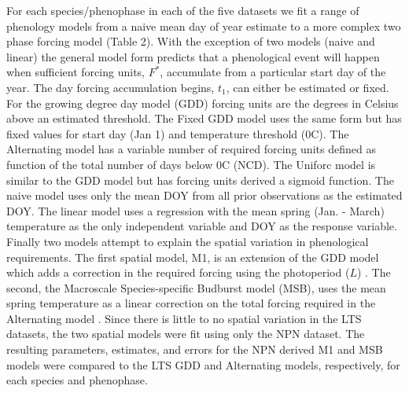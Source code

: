\documentclass[fleqn,10pt,lineno]{wlpeerj} %
\begin{document}
For each species/phenophase in each of the five datasets we fit a range of phenology models from a naive mean day of year estimate to a more complex two phase forcing model (Table 2). With the exception of two models (naive and linear) the general model form predicts that a phenological event will happen when sufficient forcing units, \(F^{*}\), accumulate from a particular start day of the year. The day forcing accumulation begins, $t_{1}$, can either be estimated or fixed. For the growing degree day model (GDD) forcing units are the degrees in Celsius above an estimated threshold. The Fixed GDD model uses the same form but has fixed values for start day (Jan 1) and temperature threshold (0C). The Alternating model has a variable number of required forcing units defined as function of the total number of days below 0C (NCD). The Uniforc model is similar to the GDD model but has forcing units derived a sigmoid function. 
 \citep{chuine2000}
The naive model uses only the mean DOY from all prior observations as the estimated DOY. The linear model uses a regression with the mean spring (Jan. - March) temperature as the only independent variable and DOY as the response variable. Finally two models attempt to explain the spatial variation in phenological requirements. The first spatial model, M1, is an extension of the GDD model which adds a correction in the required forcing using the photoperiod ($L$) \citep{blumel2012}. The second, the Macroscale Species-specific Budburst model (MSB), uses the mean spring temperature as a linear correction on the total forcing required in the Alternating model \citep{jeong2013}. Since there is little to no spatial variation in the LTS datasets, the two spatial models were fit using only the NPN dataset. The resulting parameters, estimates, and errors for the NPN derived M1 and MSB models were compared to the LTS GDD and Alternating models, respectively, for each species and phenophase.  
\end{document}
